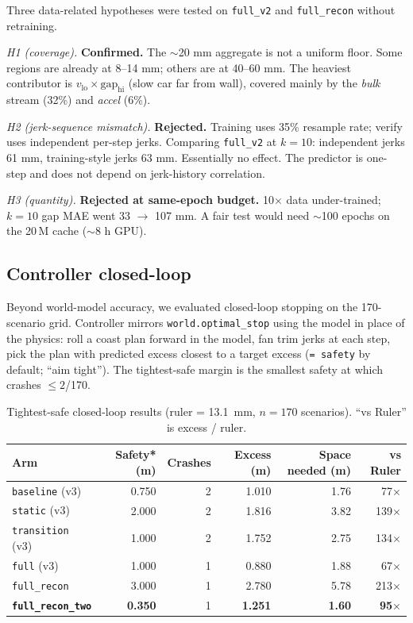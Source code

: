 \documentclass[11pt,a4paper]{article}
\begin{document}
Three data-related hypotheses were tested on \texttt{full\_v2} and
\texttt{full\_recon} without retraining.

\emph{H1 (coverage).} \textbf{Confirmed.} The $\sim$20 mm aggregate is not a
uniform floor. Some regions are already at 8--14 mm; others are at 40--60 mm.
The heaviest contributor is $v_\text{lo} \times \text{gap}_\text{hi}$
(slow car far from wall), covered mainly by the \emph{bulk} stream (32\%) and
\emph{accel} (6\%).

\emph{H2 (jerk-sequence mismatch).} \textbf{Rejected.} Training uses 35\%
resample rate; verify uses independent per-step jerks. Comparing
\texttt{full\_v2} at $k{=}10$: independent jerks 61 mm, training-style jerks
63 mm. Essentially no effect. The predictor is one-step and does not depend
on jerk-history correlation.

\emph{H3 (quantity).} \textbf{Rejected at same-epoch budget.} 10$\times$ data
under-trained; $k{=}10$ gap MAE went 33 $\to$ 107 mm. A fair test would need
$\sim$100 epochs on the 20\,M cache ($\sim$8 h GPU).

\subsection{Controller closed-loop}
\label{sec:controller}

Beyond world-model accuracy, we evaluated closed-loop stopping on the
170-scenario grid. Controller mirrors \texttt{world.optimal\_stop} using the
model in place of the physics: roll a coast plan forward in the model, fan
trim jerks at each step, pick the plan with predicted excess closest to a
target excess (\texttt{= safety} by default; ``aim tight''). The tightest-safe
margin is the smallest safety at which crashes $\le 2$/170.

\begin{table}[h]
\centering
\small
\caption{Tightest-safe closed-loop results (ruler = \SI{13.1}{\mm}, $n{=}170$
scenarios). ``vs Ruler'' is excess / ruler.}
\label{tab:controller}
\begin{tabular}{lrrrrr}
\toprule
Arm & Safety* (m) & Crashes & Excess (m) & Space needed (m) & vs Ruler \\
\midrule
\texttt{baseline} (v3)     & 0.750 & 2 & 1.010 & 1.76 &  77$\times$ \\
\texttt{static} (v3)       & 2.000 & 2 & 1.816 & 3.82 & 139$\times$ \\
\texttt{transition} (v3)   & 1.000 & 2 & 1.752 & 2.75 & 134$\times$ \\
\texttt{full} (v3)         & 1.000 & 1 & 0.880 & 1.88 &  67$\times$ \\
\texttt{full\_recon}       & 3.000 & 1 & 2.780 & 5.78 & 213$\times$ \\
\textbf{\texttt{full\_recon\_two}} & \textbf{0.350} & 1 & \textbf{1.251} & \textbf{1.60} & \textbf{95$\times$} \\
\bottomrule
\end{tabular}
\end{table}
\end{document}
